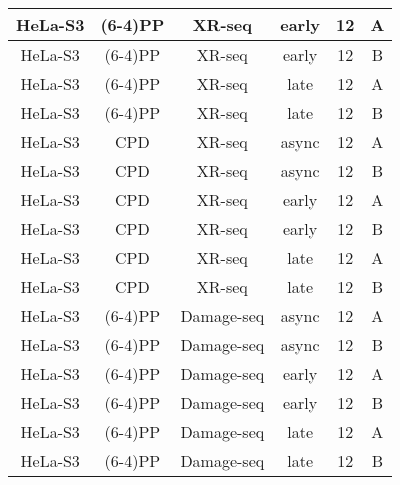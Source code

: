 \begin{table}[]
\begin{tabular}{cccccc}
    HeLa-S3           & (6-4)PP           & XR-seq         & early            & 12            & A                  \\ \hline 
    HeLa-S3           & (6-4)PP           & XR-seq         & early            & 12            & B                  \\ \hline 
    HeLa-S3           & (6-4)PP           & XR-seq         & late             & 12            & A                  \\ \hline 
    HeLa-S3           & (6-4)PP           & XR-seq         & late             & 12            & B                  \\ \hline 
    HeLa-S3           & CPD              & XR-seq         & async            & 12            & A                  \\ \hline 
    HeLa-S3           & CPD              & XR-seq         & async            & 12            & B                  \\ \hline 
    HeLa-S3           & CPD              & XR-seq         & early            & 12            & A                  \\ \hline 
    HeLa-S3           & CPD              & XR-seq         & early            & 12            & B                  \\ \hline 
    HeLa-S3           & CPD              & XR-seq         & late             & 12            & A                  \\ \hline 
    HeLa-S3           & CPD              & XR-seq         & late             & 12            & B                  \\ \hline 
    HeLa-S3           & (6-4)PP           & Damage-seq     & async            & 12            & A                  \\ \hline 
    HeLa-S3           & (6-4)PP           & Damage-seq     & async            & 12            & B                  \\ \hline 
    HeLa-S3           & (6-4)PP           & Damage-seq     & early            & 12            & A                  \\ \hline 
    HeLa-S3           & (6-4)PP           & Damage-seq     & early            & 12            & B                  \\ \hline 
    HeLa-S3           & (6-4)PP           & Damage-seq     & late             & 12            & A                  \\ \hline 
    HeLa-S3           & (6-4)PP           & Damage-seq     & late             & 12            & B                  \\ \hline 

\end{tabular}
\end{table}

